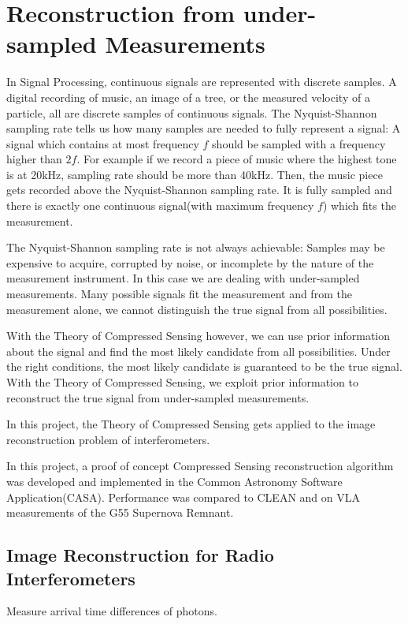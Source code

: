 \section{Reconstruction from under-sampled Measurements}\label{intro}
In Signal Processing, continuous signals are represented with discrete samples. A digital recording of music, an image of a tree, or the measured velocity of a particle, all are discrete samples of continuous signals. The Nyquist-Shannon sampling rate tells us how many samples are needed to fully represent a signal: A signal which contains at most frequency $f$ should be sampled with a frequency higher than $2f$. For example if we record a piece of music where the highest tone is at 20kHz, sampling rate should be more than 40kHz. Then, the music piece gets recorded above the Nyquist-Shannon sampling rate. It is fully sampled and there is exactly one continuous signal(with maximum frequency $f$) which fits the measurement.

The Nyquist-Shannon sampling rate is not always achievable: Samples may be expensive to acquire, corrupted by noise, or incomplete by the nature of the measurement instrument. In this case we are dealing with under-sampled measurements. Many possible signals fit the measurement and from the measurement alone, we cannot distinguish the true signal from all possibilities.

With the Theory of Compressed Sensing\cite{candes2006robust}\cite{donoho2006compressed} however, we can use prior information about the signal and find the most likely candidate from all possibilities. Under the right conditions, the most likely candidate is guaranteed to be the true signal. With the Theory of Compressed Sensing, we exploit prior information to reconstruct the true signal from under-sampled measurements.

In this project, the Theory of Compressed Sensing gets applied to the image reconstruction problem of interferometers.

In this project, a proof of concept Compressed Sensing reconstruction algorithm was developed and implemented in the Common Astronomy Software Application(CASA). Performance was compared to CLEAN and on VLA measurements of the G55 Supernova Remnant.


\subsection{Image Reconstruction for Radio Interferometers}
Measure arrival time differences of photons.

